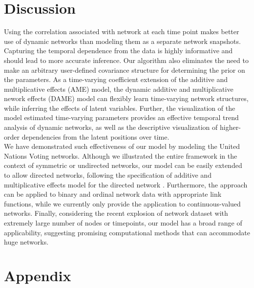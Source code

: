 \documentclass[a4paper]{article}
\begin{document}
\section{Discussion}
Using the correlation associated with network at each time point makes better use of dynamic networks than modeling them as a separate network snapshots. Capturing the temporal dependence from the data is highly informative and should lead to more accurate inference. Our algorithm also eliminates the need to make an arbitrary user-defined covariance structure for determining the prior on the parameters. As a time-varying coefficient extension of the additive and multiplicative effects (AME) model, the dynamic additive and multiplicative nework effects (DAME) model can flexibly learn time-varying network structures, while inferring the effects of latent variables. Further, the visualization of the model estimated time-varying parameters provides an effective temporal trend analysis of dynamic networks, as well as the descriptive visualization of higher-order dependencies from the latent positions over time.
\\\newline
We have demonstrated such effectiveness of our model by modeling the United Nations Voting networks. Although we illustrated the entire framework in the context of symmetric or undirected networks, our model can be easily extended to allow directed networks, following the specification of additive and multiplicative effects model for the directed network \citep{minhas2016inferential}. Furthermore, the approach can be applied to binary and ordinal network data with appropriate link functions, while we currently only provide the application to continuous-valued networks.  Finally, considering the recent explosion of network dataset with extremely large number of nodes or timepoints, our model has a broad range of applicability, suggesting promising computational methods that can accommodate huge networks.


\newpage
\section*{Appendix}
\end{document}
